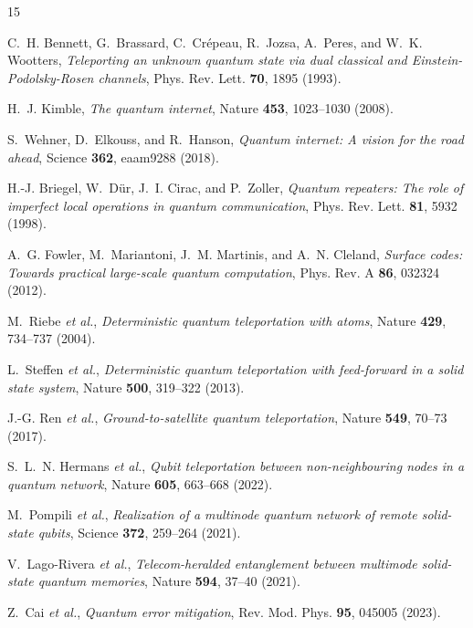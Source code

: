 \documentclass[twocolumn,preprintnumbers,amsmath,amssymb,prl]{revtex4-2}
\begin{document}
\begin{thebibliography}{15}

C.~H. Bennett, G.~Brassard, C.~Cr\'{e}peau, R.~Jozsa, A.~Peres, and W.~K. Wootters,
\textit{Teleporting an unknown quantum state via dual classical and Einstein-Podolsky-Rosen channels},
Phys. Rev. Lett. \textbf{70}, 1895 (1993).

H.~J. Kimble,
\textit{The quantum internet},
Nature \textbf{453}, 1023--1030 (2008).

S.~Wehner, D.~Elkouss, and R.~Hanson,
\textit{Quantum internet: A vision for the road ahead},
Science \textbf{362}, eaam9288 (2018).

H.-J. Briegel, W.~D\"{u}r, J.~I. Cirac, and P.~Zoller,
\textit{Quantum repeaters: The role of imperfect local operations in quantum communication},
Phys. Rev. Lett. \textbf{81}, 5932 (1998).

A.~G. Fowler, M.~Mariantoni, J.~M. Martinis, and A.~N. Cleland,
\textit{Surface codes: Towards practical large-scale quantum computation},
Phys. Rev. A \textbf{86}, 032324 (2012).

M.~Riebe \textit{et al.},
\textit{Deterministic quantum teleportation with atoms},
Nature \textbf{429}, 734--737 (2004).

L.~Steffen \textit{et al.},
\textit{Deterministic quantum teleportation with feed-forward in a solid state system},
Nature \textbf{500}, 319--322 (2013).

J.-G. Ren \textit{et al.},
\textit{Ground-to-satellite quantum teleportation},
Nature \textbf{549}, 70--73 (2017).

S.~L.~N. Hermans \textit{et al.},
\textit{Qubit teleportation between non-neighbouring nodes in a quantum network},
Nature \textbf{605}, 663--668 (2022).

M.~Pompili \textit{et al.},
\textit{Realization of a multinode quantum network of remote solid-state qubits},
Science \textbf{372}, 259--264 (2021).

V.~Lago-Rivera \textit{et al.},
\textit{Telecom-heralded entanglement between multimode solid-state quantum memories},
Nature \textbf{594}, 37--40 (2021).

Z.~Cai \textit{et al.},
\textit{Quantum error mitigation},
Rev. Mod. Phys. \textbf{95}, 045005 (2023).


\end{thebibliography}
\end{document}
